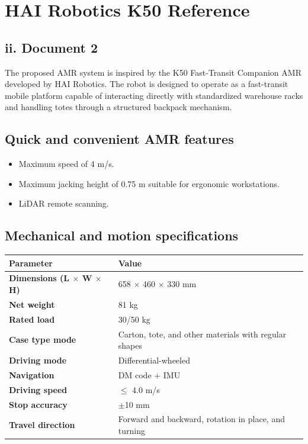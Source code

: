 \chapter{HAI Robotics K50 Reference}

\section*{ii. Document 2}

The proposed AMR system is inspired by the K50 Fast-Transit Companion AMR developed by HAI Robotics. The robot is designed to operate as a fast-transit mobile platform capable of interacting directly with standardized warehouse racks and handling totes through a structured backpack mechanism.

\section*{Quick and convenient AMR features}

\begin{itemize}
    \item Maximum speed of 4 m/s.
    \item Maximum jacking height of 0.75 m suitable for ergonomic workstations.
    \item LiDAR remote scanning.
\end{itemize}

\section*{Mechanical and motion specifications}

\begin{table}[H]
\centering
\begin{tabularx}{\textwidth}{>{\bfseries}L{0.32\textwidth}Y}
\toprule
Parameter & Value \\
\midrule
Dimensions (L $\times$ W $\times$ H) & 658 $\times$ 460 $\times$ 330 mm \\
Net weight & 81 kg \\
Rated load & 30/50 kg \\
Case type mode & Carton, tote, and other materials with regular shapes \\
Driving mode & Differential-wheeled \\
Navigation & DM code + IMU \\
Driving speed & $\leq$ 4.0 m/s \\
Stop accuracy & $\pm$10 mm \\
Travel direction & Forward and backward, rotation in place, and turning \\
\bottomrule
\end{tabularx}
\end{table}

